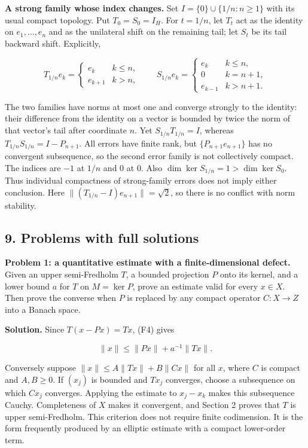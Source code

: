 \documentclass[
  11pt,
]{article}
\begin{document}
\textbf{A strong family whose index changes.} Set
\(I=\{0\}\cup\{1/n:n\geq1\}\) with its usual compact topology. Put
\(T_0=S_0=I_H\). For \(t=1/n\), let \(T_t\) act as the identity on
\(e_1,\ldots,e_n\) and as the unilateral shift on the remaining tail;
let \(S_t\) be its tail backward shift. Explicitly,

\[
T_{1/n}e_k=\begin{cases}e_k&k\leq n,\\e_{k+1}&k>n,\end{cases}
\qquad
S_{1/n}e_k=\begin{cases}e_k&k\leq n,\\0&k=n+1,\\e_{k-1}&k>n+1.\end{cases} \tag{F21}
\]

The two families have norms at most one and converge strongly to the
identity: their difference from the identity on a vector is bounded by
twice the norm of that vector's tail after coordinate \(n\). Yet
\(S_{1/n}T_{1/n}=I\), whereas \(T_{1/n}S_{1/n}=I-P_{n+1}\). All errors
have finite rank, but \(\{P_{n+1}e_{n+1}\}\) has no convergent
subsequence, so the second error family is not collectively compact. The
indices are \(-1\) at \(1/n\) and \(0\) at \(0\). Also
\(\dim\ker S_{1/n}=1>\dim\ker S_0\). Thus individual compactness of
strong-family errors does not imply either conclusion. Here
\(\|(T_{1/n}-I)e_{n+1}\|=\sqrt2\), so there is no conflict with norm
stability.

\subsection{9. Problems with full
solutions}\label{problems-with-full-solutions}

\textbf{Problem 1: a quantitative estimate with a finite-dimensional
defect.} Given an upper semi-Fredholm \(T\), a bounded projection \(P\)
onto its kernel, and a lower bound \(a\) for \(T\) on \(M=\ker P\),
prove an estimate valid for every \(x\in X\). Then prove the converse
when \(P\) is replaced by any compact operator \(C:X\to Z\) into a
Banach space.

\textbf{Solution.} Since \(T(x-Px)=Tx\), (F4) gives

\[
\|x\|\leq\|Px\|+a^{-1}\|Tx\|.                                 \tag{F22}
\]

Conversely suppose \(\|x\|\leq A\|Tx\|+B\|Cx\|\) for all \(x\), where
\(C\) is compact and \(A,B\geq0\). If \((x_j)\) is bounded and \(Tx_j\)
converges, choose a subsequence on which \(Cx_j\) converges. Applying
the estimate to \(x_j-x_k\) makes this subsequence Cauchy. Completeness
of \(X\) makes it convergent, and Section 2 proves that \(T\) is upper
semi-Fredholm. This criterion does not require finite codimension. It is
the form frequently produced by an elliptic estimate with a compact
lower-order term.
\end{document}
